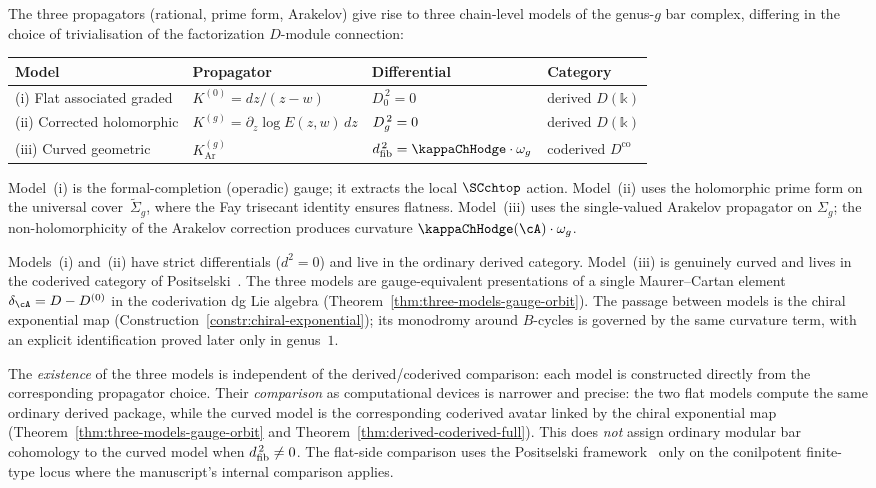 \begin{remark}
\label{rem:three-models}
The three propagators (rational, prime form, Arakelov) give rise
to three chain-level models of the genus-$g$ bar complex, differing in
the choice of trivialisation of the factorization $D$-module
connection:
\begin{center}
\renewcommand{\arraystretch}{1.25}
\begin{tabular}{llll}
\textbf{Model} & \textbf{Propagator} & \textbf{Differential} &
 \textbf{Category} \\
\hline
\textup{(i)} Flat associated graded &
 $K^{(0)} = dz/(z{-}w)$ &
 $D_0^{\,2} = 0$ &
 derived $D(\mathbb{k})$ \\
\textup{(ii)} Corrected holomorphic &
 $K^{(g)} = \partial_z \log E(z,w)\,dz$ &
 $D_{g}^{\,2} = 0$ &
 derived $D(\mathbb{k})$ \\
\textup{(iii)} Curved geometric &
 $K^{(g)}_{\mathrm{Ar}}$ &
 $\dfib^{\,2} = \kappaChHodge \cdot \omega_g$ &
 coderived $D^{\mathrm{co}}$ \\
\end{tabular}
\end{center}
Model~\textup{(i)} is the formal-completion (operadic) gauge; it
extracts the local $\SCchtop$ action. Model~\textup{(ii)} uses the
holomorphic prime form on the universal cover~$\widetilde{\Sigma}_g$,
where the Fay trisecant identity ensures flatness.
Model~\textup{(iii)} uses the single-valued Arakelov propagator on
$\Sigma_g$; the non-holomorphicity of the Arakelov correction produces
curvature $\kappaChHodge(\cA) \cdot \omega_g$.

Models~\textup{(i)} and~\textup{(ii)} have strict differentials ($d^2 = 0$)
and live in the ordinary derived category. Model~\textup{(iii)} is
genuinely curved and lives in the coderived category of
Positselski~\cite{Positselski11}. The three models are
gauge-equivalent presentations of a single Maurer--Cartan element
$\delta_\cA = D - D^{(0)}$ in the coderivation dg Lie algebra
(Theorem~\ref{thm:three-models-gauge-orbit}). The passage between
models is the chiral exponential map
(Construction~\ref{constr:chiral-exponential}); its monodromy around
$B$-cycles is governed by the same curvature term, with an explicit
identification proved later only in genus~$1$.

The \emph{existence} of the three models is independent of the
derived/coderived comparison: each model is constructed directly
from the corresponding propagator choice. Their \emph{comparison} as
computational devices is narrower and precise: the two flat models
compute the same ordinary derived package, while the curved model is
the corresponding coderived avatar linked by the chiral exponential
map
(Theorem~\ref{thm:three-models-gauge-orbit} and
Theorem~\ref{thm:derived-coderived-full}). This does \emph{not}
assign ordinary modular bar cohomology to the curved model when
$d_{\mathrm{fib}}^{\,2}\neq 0$. The flat-side comparison uses the
Positselski framework~\cite{Positselski11} only on the conilpotent
finite-type locus where the manuscript's internal comparison applies.
\end{remark}


